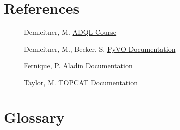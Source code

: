 \documentclass[twoside]{article}[12pt]
\begin{document}
\section{References}

\begin{description}

\item[]Demleitner, M.
\href{http://docs.g-vo.org/adql/html/}{ADQL-Course}

\item[]Demleitner, M., Becker, S.
\href{https://pyvo.readthedocs.io/en/latest/}{PyVO Documentation}

\item[]Fernique, P.
\href{https://aladin.u-strasbg.fr/java/AladinManualV10.pdf}{Aladin
Documentation}

\item[]Taylor, M.
\href{http://www.star.bris.ac.uk/~mbt/topcat/#docs}{TOPCAT Documentation}

\end{description}

\section{Glossary}

\begin{description}



\end{description}

   
 
\end{document}
